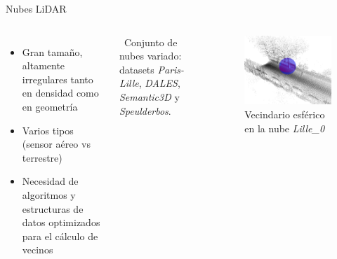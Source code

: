 \documentclass[aspectratio=169]{beamer}
\begin{document}
\begin{frame}{Nubes LiDAR}
    \begin{columns}
            \begin{itemize}
                \item Gran tamaño, altamente irregulares tanto en densidad como en geometría
                \item Varios tipos (sensor aéreo vs terrestre)
                \item Necesidad de algoritmos y estructuras de datos optimizados para el cálculo de vecinos
            \end{itemize}        
        
        \textrightarrow~Conjunto de nubes variado: datasets \textit{Paris-Lille}, \textit{DALES}, \textit{Semantic3D} y \textit{Speulderbos}.

        \begin{figure}
            \centering
            \includegraphics[scale=0.65]{img/vecindario_lille.png}
            \caption{Vecindario esférico en la nube \textit{Lille\_0}}
        \end{figure}
    \end{columns}
\end{frame}
\end{document}
